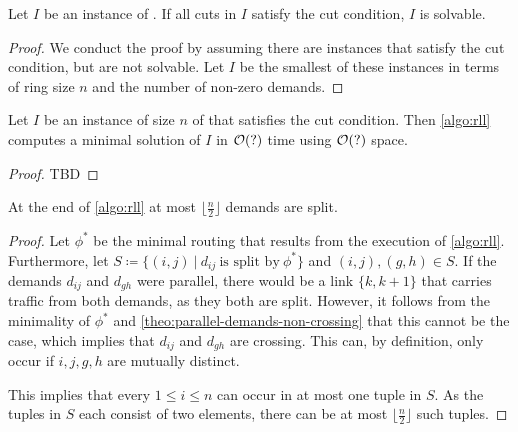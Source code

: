 \begin{theorem}
	\label{theo:cut-condition}
	Let $I$ be an instance of \RRL.
	If all cuts in $I$ satisfy the cut condition, $I$ is solvable.
\end{theorem}
\begin{proof}
	We conduct the proof by assuming there are instances that satisfy the cut condition, but are not solvable.
	Let $I$ be the smallest of these instances in terms of ring size $n$ and the number of non-zero demands.
\end{proof}



\begin{theorem}
	Let $I$ be an instance of size $n$ of \RRL that satisfies the cut condition.
	Then \cref{algo:rll} computes a minimal solution of $I$ in $\mathcal{O}(?)$ time using $\mathcal{O}(?)$ space.
\end{theorem}
\begin{proof}
	TBD
\end{proof}

\begin{lemma}
	At the end of \cref{algo:rll} at most $\lfloor\frac{n}{2}\rfloor$ demands are split.
\end{lemma}
\begin{proof}
	Let $\phi^\ast$ be the minimal routing that results from the execution of \cref{algo:rll}.
	Furthermore, let $S \coloneqq \{(i, j)\ |\ d_{ij}\ \text{is split by}\ \phi^\ast \}$ and $(i, j), (g, h) \in S$.
	If the demands $d_{ij}$ and $d_{gh}$ were parallel, there would be a link $\{k, k+1\}$ that carries traffic from both demands, as they both are split.
	However, it follows from the minimality of $\phi^\ast$ and \cref{theo:parallel-demands-non-crossing} that this cannot be the case, which implies that $d_{ij}$ and $d_{gh}$ are crossing.
	This can, by definition, only occur if $i, j, g, h$ are mutually distinct.
	
	This implies that every $1 \leq i \leq n$ can occur in at most one tuple in $S$.
	As the tuples in $S$ each consist of two elements, there can be at most $\lfloor\frac{n}{2}\rfloor$ such tuples.
\end{proof}